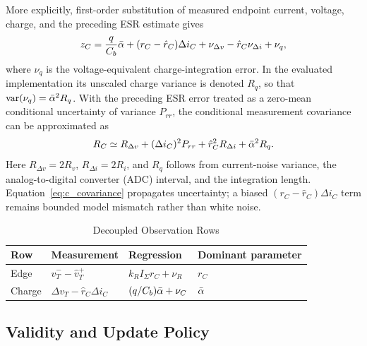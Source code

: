 More explicitly, first-order substitution of measured endpoint current, voltage, charge, and the preceding ESR estimate gives
\begin{multline}
z_C=\frac{q}{C_b}\bar{\alpha}+(r_C-\hat r_C)\Delta i_C
+\nu_{\Delta v}-\hat r_C\nu_{\Delta i}+\nu_q,
\label{eq:c_mismatch}
\end{multline}
where $\nu_q$ is the voltage-equivalent charge-integration error. In the evaluated implementation its unscaled charge variance is denoted $R_q$, so that $\operatorname{var}(\nu_q)=\bar{\alpha}^2R_q$. With the preceding ESR error treated as a zero-mean conditional uncertainty of variance $P_{rr}$, the conditional measurement covariance can be approximated as
\begin{equation}
R_C\simeq R_{\Delta v}+(\Delta i_C)^2P_{rr}
+\hat r_C^2R_{\Delta i}+\bar{\alpha}^2R_q.
\label{eq:c_covariance}
\end{equation}
Here $R_{\Delta v}=2R_v$, $R_{\Delta i}=2R_i$, and $R_q$ follows from current-noise variance, the analog-to-digital converter (ADC) interval, and the integration length. Equation~\eqref{eq:c_covariance} propagates uncertainty; a biased $(r_C-\hat r_C)\Delta i_C$ term remains bounded model mismatch rather than white noise.

\begin{table}[t]
\caption{Decoupled Observation Rows}
\label{tab:observations}
\centering
\footnotesize
\begin{tabular}{p{0.9cm}p{2.35cm}p{2.1cm}p{1.35cm}}
\toprule
Row & Measurement & Regression & Dominant parameter \\
\midrule
Edge & $\hat v_T^- -\hat v_T^+$ & $k_R I_\Sigma r_C+\nu_R$ & $r_C$ \\
Charge & $\Delta v_T-\hat r_C\Delta i_C$ & $(q/C_b)\bar{\alpha}+\nu_C$ & $\bar{\alpha}$ \\
\bottomrule
\end{tabular}
\end{table}

\subsection{Validity and Update Policy}

